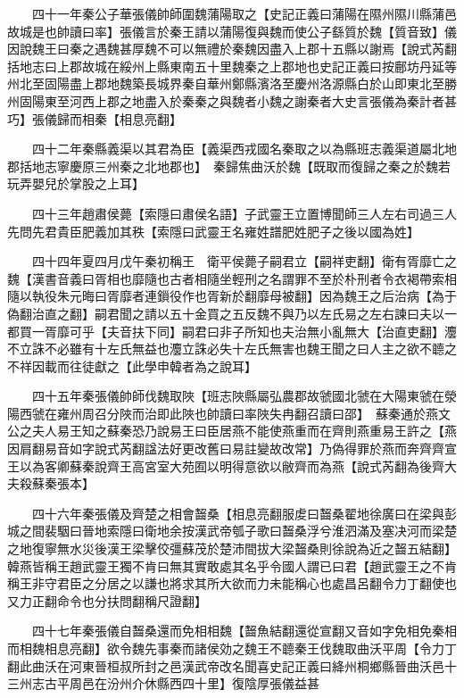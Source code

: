 　　四十一年秦公子華張儀帥師圍魏蒲陽取之【史記正義曰蒲陽在隰州隰川縣蒲邑故城是也帥讀曰率】張儀言於秦王請以蒲陽復與魏而使公子繇質於魏【質音致】儀因說魏王曰秦之遇魏甚厚魏不可以無禮於秦魏因盡入上郡十五縣以謝焉【說式芮翻括地志曰上郡故城在綏州上縣東南五十里魏秦之上郡地也史記正義曰按鄜坊丹延等州北至固陽盡上郡地魏築長城界秦自華州鄭縣濱洛至慶州洛源縣白於山即東北至勝州固陽東至河西上郡之地盡入於秦秦之與魏者小魏之謝秦者大史言張儀為秦計者甚巧】張儀歸而相秦【相息亮翻】

　　四十二年秦縣義渠以其君為臣【義渠西戎國名秦取之以為縣班志義渠道屬北地郡括地志寧慶原三州秦之北地郡也】　秦歸焦曲沃於魏【既取而復歸之秦之於魏若玩弄嬰兒於掌股之上耳】

　　四十三年趙肅侯薨【索隱曰肅侯名語】子武靈王立置博聞師三人左右司過三人先問先君貴臣肥義加其秩【索隱曰武靈王名雍姓譜肥姓肥子之後以國為姓】

　　四十四年夏四月戊午秦初稱王　衛平侯薨子嗣君立【嗣祥吏翻】衛有胥靡亡之魏【漢書音義曰胥相也靡隨也古者相隨坐輕刑之名謂罪不至於朴刑者令衣褐帶索相隨以執役朱元晦曰胥靡者連鎻役作也胥新於翻靡母被翻】因為魏王之后治病【為于偽翻治直之翻】嗣君聞之請以五十金買之五反魏不與乃以左氏易之左右諫曰夫以一都買一胥靡可乎【夫音扶下同】嗣君曰非子所知也夫治無小亂無大【治直吏翻】灋不立誅不必雖有十左氏無益也灋立誅必失十左氏無害也魏王聞之曰人主之欲不聼之不祥因載而往徒獻之【此學申韓者為之說耳】

　　四十五年秦張儀帥師伐魏取陜【班志陜縣屬弘農郡故虢國北虢在大陽東虢在滎陽西虢在雍州周召分陜而治即此陜也帥讀曰率陜失冉翻召讀曰邵】　蘇秦通於燕文公之夫人易王知之蘇秦恐乃說易王曰臣居燕不能使燕重而在齊則燕重易王許之【燕因肩翻易音如字說式芮翻諡法好更改舊曰易註變故改常】乃偽得罪於燕而奔齊齊宣王以為客卿蘇秦說齊王高宮室大苑囿以明得意欲以敝齊而為燕【說式芮翻為後齊大夫殺蘇秦張本】

　　四十六年秦張儀及齊楚之相會齧桑【相息亮翻服䖍曰齧桑翟地徐廣曰在梁與彭城之間裴駰曰晉地索隱曰衛地余按漢武帝瓠子歌曰齧桑浮兮淮泗滿及塞决河而梁楚之地復寧無水災後漢王梁擊佼彊蘇茂於楚沛間拔大梁齧桑則徐說為近之齧五結翻】　韓燕皆稱王趙武靈王獨不肯曰無其實敢處其名乎令國人謂已曰君【趙武靈王之不肯稱王非守君臣之分居之以謙也將求其所大欲而力未能稱心也處昌呂翻令力丁翻使也又力正翻命令也分扶問翻稱尺證翻】

　　四十七年秦張儀自齧桑還而免相相魏【齧魚結翻還從宣翻又音如字免相免秦相而相魏相息亮翻】欲令魏先事秦而諸侯効之魏王不聼秦王伐魏取曲沃平周【令力丁翻此曲沃在河東晉桓叔所封之邑漢武帝改名聞喜史記正義曰絳州桐鄉縣晉曲沃邑十三州志古平周邑在汾州介休縣西四十里】復陰厚張儀益甚

